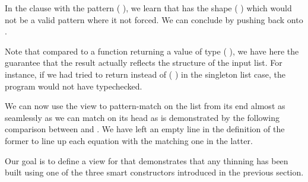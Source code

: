 %
In the clause with the pattern ( \IdrisData{:<} ), we learn
that  has the shape ( \IdrisFunction{++} )
which would not be a valid pattern where it not forced.
%
We can conclude by pushing  back onto .

Note that compared to a function returning a value of type
{ ( \IdrisType{,} )},
we have here the guarantee that the result actually reflects the structure of the
input list.
%
For instance, if we had tried to return  instead of
(\IdrisData{[]} \IdrisData{:<} ) in the singleton list case,
the program would not have typechecked.

We can now use the view to pattern-match on the list from its end almost as
seamlessly as we can match on its head as is demonstrated by the following
comparison between  and .
%
We have left an empty line in the definition of the former to line up each
equation with the matching one in the latter.

\noindent
\begin{minipage}[t]{0.45\textwidth}
\end{minipage}\hfill
\begin{minipage}[t]{0.45\textwidth}
\end{minipage}

Our goal is to define a view for  that demonstrates
that any thinning has been built using one of the three smart
constructors introduced in the previous section.
